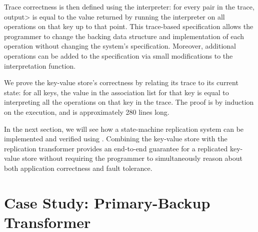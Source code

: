Trace correctness is then defined using the interpreter: for every
 pair in the trace,
\<output> is equal to the value returned by running the
interpreter on all operations on that key up to that point.
This trace-based specification allows the programmer to change the
backing data structure and implementation of each operation
without changing the system's specification. Moreover, additional
operations can be added to the specification via small modifications to the
interpretation function.

We prove the key-value store's correctness by relating its trace to
its current state: for all keys, the value in the association list for
that key is equal to interpreting all the operations on that key in
the trace. The proof is by induction on the execution, and is
approximately 280 lines long.

In the next section, we will see how a state-machine replication
system can be implemented and verified using \Verdi. Combining the
key-value store with the replication transformer provides an
end-to-end guarantee for a replicated key-value store without
requiring the programmer to simultaneously reason about both
application correctness and fault tolerance.

\section{Case Study: Primary-Backup Transformer}\label{sec:verdi:casestudy-pbj}

